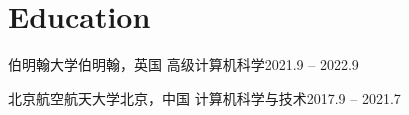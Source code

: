 \section{Education}


\begin{CVentries}
  \CVentry
  \CVhead
  {伯明翰大学}{伯明翰，英国}
  {高级计算机科学}{2021.9 -- 2022.9}

  \CVentry
  \CVhead
  {北京航空航天大学}{北京，中国}
  {计算机科学与技术}{2017.9 -- 2021.7}
\end{CVentries}

